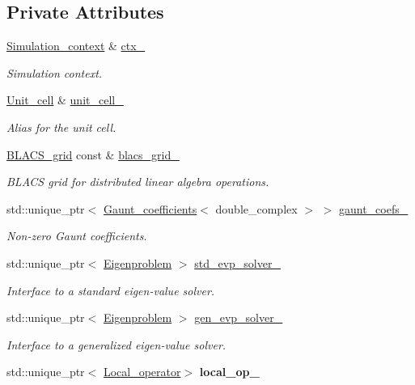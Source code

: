 \subsection*{Private Attributes}
\begin{DoxyCompactItemize}
\item 
\hyperlink{classsirius_1_1_simulation__context}{Simulation\+\_\+context} \& \hyperlink{classsirius_1_1_band_a355ecbcf2139f3a5ae0ff33aa2409d58}{ctx\+\_\+}
\begin{DoxyCompactList}\small\item\em Simulation context. \end{DoxyCompactList}\item 
\hyperlink{classsirius_1_1_unit__cell}{Unit\+\_\+cell} \& \hyperlink{classsirius_1_1_band_a8776f7df889f8bca82ff5a9a24331205}{unit\+\_\+cell\+\_\+}
\begin{DoxyCompactList}\small\item\em Alias for the unit cell. \end{DoxyCompactList}\item 
\hyperlink{classsddk_1_1_b_l_a_c_s__grid}{B\+L\+A\+C\+S\+\_\+grid} const \& \hyperlink{classsirius_1_1_band_a621c3610318f8b26c0f4167c3a0dca76}{blacs\+\_\+grid\+\_\+}
\begin{DoxyCompactList}\small\item\em B\+L\+A\+C\+S grid for distributed linear algebra operations. \end{DoxyCompactList}\item 
std\+::unique\+\_\+ptr$<$ \hyperlink{classsirius_1_1_gaunt__coefficients}{Gaunt\+\_\+coefficients}$<$ double\+\_\+complex $>$ $>$ \hyperlink{classsirius_1_1_band_a20c18e018c120ad6f901d046720decce}{gaunt\+\_\+coefs\+\_\+}
\begin{DoxyCompactList}\small\item\em Non-\/zero Gaunt coefficients. \end{DoxyCompactList}\item 
std\+::unique\+\_\+ptr$<$ \hyperlink{class_eigenproblem}{Eigenproblem} $>$ \hyperlink{classsirius_1_1_band_aa8e787f36f24f395d19bf617f3165398}{std\+\_\+evp\+\_\+solver\+\_\+}
\begin{DoxyCompactList}\small\item\em Interface to a standard eigen-\/value solver. \end{DoxyCompactList}\item 
std\+::unique\+\_\+ptr$<$ \hyperlink{class_eigenproblem}{Eigenproblem} $>$ \hyperlink{classsirius_1_1_band_a65ee266c73c0f8da01fc25db867ad119}{gen\+\_\+evp\+\_\+solver\+\_\+}
\begin{DoxyCompactList}\small\item\em Interface to a generalized eigen-\/value solver. \end{DoxyCompactList}\item 
\hypertarget{classsirius_1_1_band_ac40372d294214f83f0c149ff0968d19c}{}std\+::unique\+\_\+ptr$<$ \hyperlink{classsirius_1_1_local__operator}{Local\+\_\+operator}$>$ {\bfseries local\+\_\+op\+\_\+}\label{classsirius_1_1_band_ac40372d294214f83f0c149ff0968d19c}

\end{DoxyCompactItemize}


